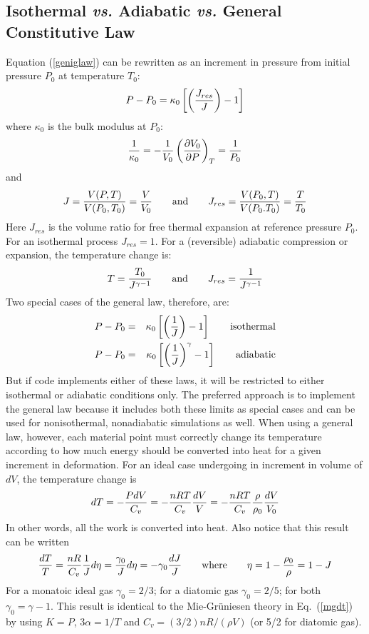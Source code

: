 \documentclass[11pt]{book}
\begin{document}
\subsection{Isothermal {\em vs.} Adiabatic {\em vs.} General Constitutive Law}

Equation (\ref{geniglaw}) can be rewritten as an increment in pressure from initial pressure $P_0$ at temperature $T_0$:
\begin{equation}
    P - P_0 = \kappa_0\left[\left(J_{res}\over J\right)-1\right]
\end{equation}
where $\kappa_0$ is the bulk modulus at $P_0$:
\begin{equation}
   {1\over \kappa_0} = -{1\over V_0} \left({\partial V_0\over \partial P}\right)_T = {1\over P_0}
\end{equation}
and
\begin{equation}
    J = {V(P,T)\over V(P_0,T_0)}={V\over V_0} \qquad{\rm and}\qquad J_{res} = {V(P_0,T)\over V(P_0.T_0)} = {T\over T_0}
\end{equation}
Here $J_{res}$ is the volume ratio for free thermal expansion at reference pressure $P_0$. For an isothermal process $J_{res}=1$. For a (reversible) adiabatic compression or expansion, the temperature change is:
\begin{equation}
       T = {T_0\over J^{\gamma-1}} \qquad{\rm and}\qquad J_{res} = {1\over J^{\gamma-1}}
\end{equation}
Two special cases of the general law, therefore, are:
\begin{eqnarray}
   P - P_0 & = & \kappa_0\left[\left(1\over J\right)-1\right]  \qquad{\rm isothermal} \\
   P - P_0 & = & \kappa_0\left[\left(1\over J\right)^\gamma-1\right]  \qquad{\rm adiabatic}
\end{eqnarray}
But if code implements either of these laws, it will be restricted to either isothermal or adiabatic conditions only. The preferred approach is to implement the general law because it includes both these limits as special cases and can be used for nonisothermal, nonadiabatic simulations as well. When using a general law, however, each  material point must correctly change its temperature according to how much energy should be converted into heat for a given increment in deformation. For an ideal case undergoing in increment in volume of $dV$, the temperature change is
\begin{equation}
    dT = -{P dV\over C_v} = -{nRT \over C_v}{dV \over V} = -{nRT \over C_v}{\rho\over\rho_0}{dV \over V_0}
\end{equation}
In other words, all the work is converted into heat. Also notice that this result can be written
\begin{equation}
    {dT\over T} = {nR \over C_v}{1\over J}d\eta = {\gamma_0\over J}d\eta = -\gamma_0{dJ\over J} \qquad{\rm where}\qquad \eta = 1 - {\rho_0\over \rho} = 1 - J    \label{igdt}
\end{equation}
For a monatoic ideal gas $\gamma_0=2/3$; for a diatomic gas $\gamma_0=2/5$; for both $\gamma_0=\gamma-1$. This result is identical to the Mie-Gr\"{u}niesen theory in Eq.~(\ref{mgdt}) by using $K=P$, $3\alpha=1/T$ and $C_v = (3/2)nR/(\rho V)$ (or 5/2 for diatomic gas).
\end{document}
